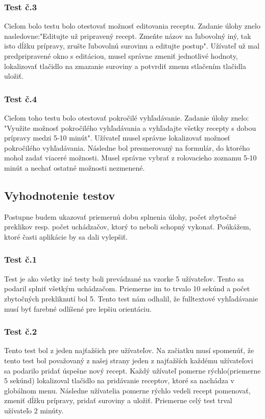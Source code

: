 \documentclass[12pt,a4paper,titlepage,final]{article}
\begin{document}
\subsubsection{Test č.3}
Cieľom bolo testu bolo otestovať možnosť editovania receptu. Zadanie úlohy znelo nasledovne:"Editujte už pripravený recept. Zmeňte názov na ľubovolný iný, tak isto dĺžku prípravy, zrušte ľubovolnú surovinu a editujte postup". Užívateľ už mal predpripravené okno s editáciou, musel správne zmeniť jednotlivé hodnoty, lokalizovať tlačidlo na zmazanie suroviny a potvrdiť zmenu stlačením tlačidla uložiť.

\subsubsection{Test č.4}
Cieľom toho testu bolo otestovať pokročilé vyhľadávanie. Zadanie úlohy znelo: "Využite možnosť pokročilého vyhľadávania a vyhľadajte všetky recepty s dobou prípravy medzi 5-10 minút". Užívateľ musel správne lokalizovať možnosť pokročilého vyhľadávania. Následne bol presmerovaný na formulár, do ktorého mohol zadať viaceré možnosti. Musel správne vybrať z rolovacieho zoznamu 5-10 minút a nechať ostatné možnosti nezmenené.





\subsection{Vyhodnotenie testov}
Postupne budem ukazovať priemernú dobu splnenia úlohy, počet zbytočné preklikov resp. počet uchádzačov, ktorý to neboli schopný vykonať. Poúkážem, ktoré časti aplikácie by sa dali vylepšiť.

\subsubsection{Test č.1}
Test je ako všetky iné testy boli prevádzané na vzorke 5 užívateľov. Tento sa podaril splniť všetkým uchádzačom. Priemerne im to trvalo 10 sekúnd a počet zbytočných prekliknutí bol 5. Tento test nám odhalil, že fulltextové vyhľadávanie musí byť farebné odlíšené pre lepšiu orientáciu.

\subsubsection{Test č.2}
Tento test bol z jeden najťažśich pre užívateľov. Na začiatku musí spomenúť, že tento test bol považovaný  z našej strany jeden z najťažších každému užívateľovi sa podarilo pridať úspešne nový recept. Každý užívateľ pomerne rýchlo(priemerne 5 sekúnd) lokalizoval tlačidlo na pridávanie receptov, ktoré sa nachádza v globálnom menu. Následne užívatelia pomerne rýchlo vedeli recept pomenovať, zmeniť dĺžku prípravy, pridať suroviny a uložiť. Priemerne celý test trval užívateľo 2 minúty.
\end{document}
